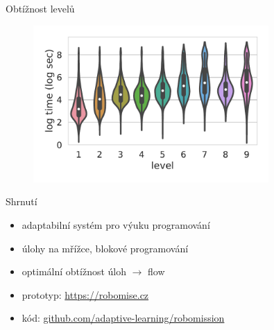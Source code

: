 \documentclass[
]{beamer}
\begin{document}
\begin{frame}{Obtížnost levelů}
\begin{figure}
\includegraphics[width=0.8\textwidth]{../img/levels-time}
\end{figure}
\end{frame}

\begin{frame}{Shrnutí}
\begin{itemize}
\item adaptabilní systém pro výuku programování
\item úlohy na mřížce, blokové programování
\item optimální obtížnost úloh $\rightarrow$ flow
\item prototyp: \url{https://robomise.cz}
\item kód: \url{github.com/adaptive-learning/robomission}
\end{itemize}
\end{frame}


\end{document}
